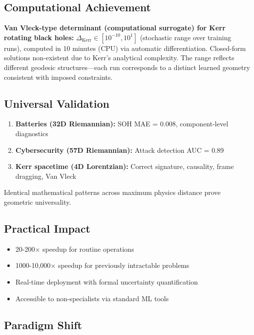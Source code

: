 \documentclass[11pt,a4paper]{article}
\begin{document}
\subsection{Computational Achievement}

\textbf{Van Vleck-type determinant (computational surrogate) for Kerr rotating black holes:} $\Delta_{\text{Kerr}} \in [10^{-10}, 10^{1}]$ (stochastic range over training runs), computed in 10 minutes (CPU) via automatic differentiation. Closed-form solutions non-existent due to Kerr's analytical complexity. The range reflects different geodesic structures—each run corresponds to a distinct learned geometry consistent with imposed constraints.

\subsection{Universal Validation}

\begin{enumerate}
\item \textbf{Batteries (32D Riemannian):} SOH MAE = 0.008, component-level diagnostics
\item \textbf{Cybersecurity (57D Riemannian):} Attack detection AUC = 0.89
\item \textbf{Kerr spacetime (4D Lorentzian):} Correct signature, causality, frame dragging, Van Vleck
\end{enumerate}

Identical mathematical patterns across maximum physics distance prove geometric universality.

\subsection{Practical Impact}

\begin{itemize}
\item 20-200$\times$ speedup for routine operations
\item 1000-10,000$\times$ speedup for previously intractable problems
\item Real-time deployment with formal uncertainty quantification
\item Accessible to non-specialists via standard ML tools
\end{itemize}

\subsection{Paradigm Shift}
\end{document}
